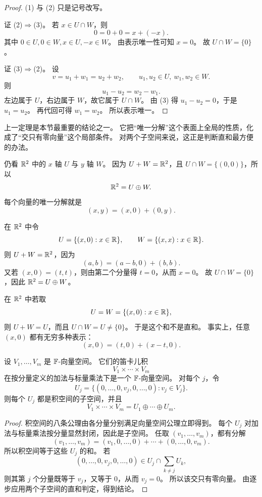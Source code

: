 \begin{proof} (1) 与 (2) 只是记号改写。

证 (2)$\Rightarrow$(3)。 若 $x\in U\cap W$，则
\[ 0=0+0=x+(-x).
\] 其中 $0\in U,0\in W,x\in U,-x\in W$。
由表示唯一性可知 $x=0$。 故 $U\cap W=\{0\}$。

证 (3)$\Rightarrow$(2)。 设
\[ v=u_1+w_1=u_2+w_2,
\qquad u_1,u_2\in U,\ w_1,w_2\in W. \]
则 \[
u_1-u_2=w_2-w_1. \]
左边属于 $U$，右边属于 $W$，故它属于 $U\cap W$。 由 (3) 得 $u_1-u_2=0$，于是 $u_1=u_2$。
再代回可得 $w_1=w_2$。 所以表示唯一。
\end{proof}

\begin{remark} 上一定理是本节最重要的结论之一。
它把“唯一分解”这个表面上全局的性质，化成了“交只有零向量”这个局部条件。 对两个子空间来说，这正是判断直和最方便的办法。
\end{remark}

\begin{example} 仍看 $\mathbb{R}^2$ 中的 $x$ 轴 $U$ 与 $y$ 轴 $W$。
因为 $U+W=\mathbb{R}^2$，且 $U\cap W=\{(0,0)\}$，所以 \[
\mathbb{R}^2=U\oplus W. \]
每个向量的唯一分解就是 \[
(x,y)=(x,0)+(0,y). \]
\end{example}

\begin{example} 在 $\mathbb{R}^2$ 中令
\[ U=\{(x,0):x\in\mathbb{R}\},
\qquad W=\{(x,x):x\in\mathbb{R}\}.
\] 则 $U+W=\mathbb{R}^2$，因为
\[ (a,b)=(a-b,0)+(b,b).
\] 又若 $(x,0)=(t,t)$，则由第二个分量得 $t=0$，从而 $x=0$。
故 $U\cap W=\{0\}$，因此 $\mathbb{R}^2=U\oplus W$。 \end{example}

\begin{example} 在 $\mathbb{R}^2$ 中若取
\[ U=W=\{(x,0):x\in\mathbb{R}\},
\] 则 $U+W=U$，而且 $U\cap W=U\neq\{0\}$。
于是这个和不是直和。 事实上，任意 $(x,0)$ 都有无穷多种表示：
\[ (x,0)=(t,0)+(x-t,0).
\] \end{example}

\begin{proposition}[积空间与外直和] 设 $V_1,\dots,V_m$ 是 $\mathbb{F}$-向量空间。
它们的笛卡儿积 \[
V_1\times\cdots\times V_m \]
在按分量定义的加法与标量乘法下是一个 $\mathbb{F}$-向量空间。 对每个 $j$，令
\[ U_j=\{(0,\dots,0,v_j,0,\dots,0):v_j\in V_j\}.
\] 则每个 $U_j$ 都是积空间的子空间，并且
\[ V_1\times\cdots\times V_m=U_1\oplus\cdots\oplus U_m.
\] \end{proposition}

\begin{proof} 积空间的八条公理由各分量分别满足向量空间公理立即得到。
每个 $U_j$ 对加法与标量乘法按分量显然封闭，因此是子空间。 任取 $(v_1,\dots,v_m)$，都有分解
\[ (v_1,\dots,v_m)=
(v_1,0,\dots,0)+\cdots+(0,\dots,0,v_m). \]
所以积空间等于这些 $U_j$ 的和。 若
\[ (0,\dots,0,v_j,0,\dots,0)
\in U_j\cap\sum_{k\neq j}U_k, \]
则其第 $j$ 个分量既等于 $v_j$，又等于 $0$，从而 $v_j=0$。 所以该交只有零向量。
由逐步应用两个子空间的直和判定，得到结论。 \end{proof}

